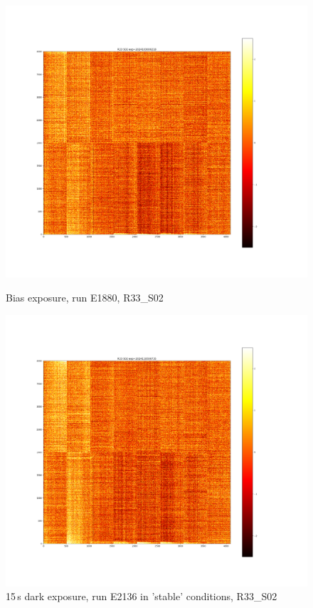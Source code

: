 \begin{figure}[htbp]
\centering
\begin{minipage}{0.45\textwidth}
    \centering
    \includegraphics[width=\textwidth]{figures/E1880_bias_R33_S02.png}
    \caption{Bias exposure, run E1880, R33\_S02}
    \label{fig:r33_s02_1880}
\end{minipage}
\hfill
\begin{minipage}{0.45\textwidth}
    \centering
    \includegraphics[width=\textwidth]{figures/E2136_dark15_R33_S02.png}
    \caption{15\,s dark exposure, run E2136 in 'stable' conditions, R33\_S02}
    \label{fig:r33_s02_2136}
\end{minipage}


\end{figure}
